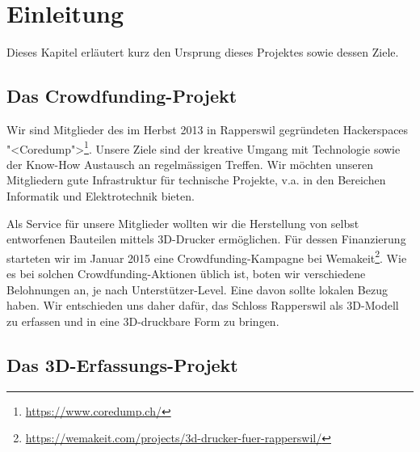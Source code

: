 \chapter{Einleitung}

\label{ch:einleitung}


Dieses Kapitel erläutert kurz den Ursprung dieses Projektes sowie dessen Ziele.


\section{Das Crowdfunding-Projekt}\label{sec:crowdfunding}

Wir sind Mitglieder des im Herbst 2013 in Rapperswil gegründeten Hackerspaces
"<Coredump">\footnote{\url{https://www.coredump.ch/}}. Unsere Ziele sind der
kreative Umgang mit Technologie sowie der Know-How Austausch an regelmässigen
Treffen. Wir möchten unseren Mitgliedern gute Infrastruktur für technische
Projekte, v.a. in den Bereichen Informatik und Elektrotechnik bieten.


Als Service für unsere Mitglieder wollten wir die Herstellung von selbst entworfenen
Bauteilen mittels 3D-Drucker ermöglichen. Für dessen Finanzierung starteten
wir im Januar 2015 eine Crowdfunding-Kampagne bei
Wemakeit\footnote{\url{https://wemakeit.com/projects/3d-drucker-fuer-rapperswil/}}.
Wie es bei solchen Crowdfunding-Aktionen üblich ist, boten wir verschiedene
Belohnungen an, je nach Unterstützer-Level. Eine davon sollte lokalen Bezug haben.
Wir entschieden uns daher dafür, das Schloss Rapperswil als 3D-Modell zu
erfassen und in eine 3D-druckbare Form zu bringen.


\section{Das 3D-Erfassungs-Projekt}\label{sec:3d-project}

